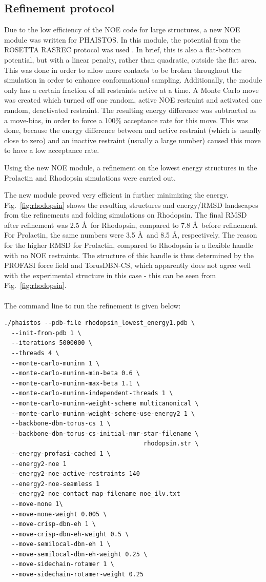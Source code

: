 \subsection{Refinement protocol}

Due to the low efficiency of the NOE code for large structures, a new NOE module was written for PHAISTOS. In this module, the potential from the ROSETTA RASREC protocol was used \cite{LangePNAS2012}.
In brief, this is also a flat-bottom potential, but with a linear penalty, rather than quadratic, outside the flat area.
This was done in order to allow more contacts to be broken throughout the simulation in order to enhance conformational sampling.
Additionally, the module only has a certain fraction of all restraints active at a time.
A Monte Carlo move was created which turned off one random, active NOE restraint and activated one random, deactivated restraint.
The resulting energy difference was subtracted as a move-bias, in order to force a 100\% acceptance rate for this move.
This was done, because the energy difference between and active restraint (which is usually close to zero) and an inactive restraint (usually a large number) caused this move to have a low acceptance rate.

Using the new NOE module, a refinement on the lowest energy structures in the Prolactin and Rhodopsin simulations were carried out.

The new module proved very efficient in further minimizing the energy.
Fig.~\ref{fig:rhodopsin} shows the resulting structures and energy/RMSD landscapes from the refinements and folding simulations on Rhodopsin.
The final RMSD after refinement was 2.5 \AA~for Rhodopsin, compared to 7.8 \AA~before refinement.
For Prolactin, the same numbers were 3.5 \AA~and 8.5 \AA, respectively.
The reason for the higher RMSD for Prolactin, compared to Rhodopsin is a flexible handle with no NOE restraints.
The structure of this handle is thus determined by the PROFASI force field and TorusDBN-CS, which apparently does not agree well with the experimental structure in this case - this can be seen from Fig.~\ref{fig:rhodopsin}.
\\\\The command line to run the refinement is given below:
\begin{lstlisting}
./phaistos --pdb-file rhodopsin_lowest_energy1.pdb \
  --init-from-pdb 1 \
  --iterations 5000000 \
  --threads 4 \
  --monte-carlo-muninn 1 \
  --monte-carlo-muninn-min-beta 0.6 \
  --monte-carlo-muninn-max-beta 1.1 \
  --monte-carlo-muninn-independent-threads 1 \
  --monte-carlo-muninn-weight-scheme multicanonical \
  --monte-carlo-muninn-weight-scheme-use-energy2 1 \
  --backbone-dbn-torus-cs 1 \
  --backbone-dbn-torus-cs-initial-nmr-star-filename \
                                      rhodopsin.str \
  --energy-profasi-cached 1 \
  --energy2-noe 1
  --energy2-noe-active-restraints 140
  --energy2-noe-seamless 1
  --energy2-noe-contact-map-filename noe_ilv.txt
  --move-none 1\
  --move-none-weight 0.005 \
  --move-crisp-dbn-eh 1 \
  --move-crisp-dbn-eh-weight 0.5 \
  --move-semilocal-dbn-eh 1 \
  --move-semilocal-dbn-eh-weight 0.25 \
  --move-sidechain-rotamer 1 \
  --move-sidechain-rotamer-weight 0.25
\end{lstlisting}


